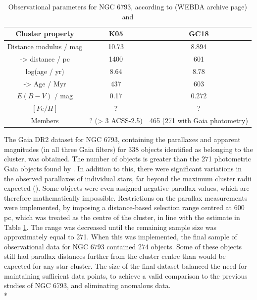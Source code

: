 \documentclass[12pt, a4paper]{report}
\begin{document}
\begin{table}
\begin{center}
\begin{tabular}{ccc}
\hline
Cluster property & K05 & GC18 \\
\hline
Distance modulus / mag & 10.73 & 8.894 \\
-> distance / pc & 1400 & 601 \\
log(age / yr) & 8.64 & 8.78 \\
-> Age / Myr & 437 & 603 \\
$E(B-V)$ / mag & 0.17 & 0.272 \\
$[Fe/H]$ & ? & ? \\
Members & ? (> 3 ACSS-2.5) & 465 (271 with Gaia photometry) \\
\hline
\end{tabular}
\caption{Observational parameters for NGC 6793, according to \cite{2005A&A...438.1163K} (WEBDA archive page) and \cite{2018A&A...616A..10G}}
\label{NGC6793_obs}
\end{center}
\end{table}

The Gaia DR2 dataset for NGC 6793, containing the parallaxes and apparent magnitudes (in all three Gaia filters) for 338 objects identified as belonging to the cluster, was obtained. The number of objects is greater than the 271 photometric Gaia objects found by \cite{2018A&A...616A..10G}. In addition to this, there were significant variations in the observed parallaxes of individual stars, far beyond the maximum cluster radii expected (\cite{2006A&A...456..523S}). Some objects were even assigned negative parallax values, which are therefore mathematically impossible. Restrictions on the parallax measurements were implemented, by imposing a distance-based selection range centred at 600 pc, which was treated as the centre of the cluster, in line with the \cite{2018A&A...616A..10G} estimate in Table \ref{NGC6793_obs}. The range was decreased until the remaining sample size was approximately equal to 271. When this was implemented, the final sample of observational data for NGC 6793 contained 274 objects. Some of these objects still had parallax distances further from the cluster centre than would be expected for any star cluster. The size of the final dataset balanced the need for maintaining sufficient data points, to achieve a valid comparison to the previous studies of NGC 6793, and eliminating anomalous data.\\*
\end{document}
